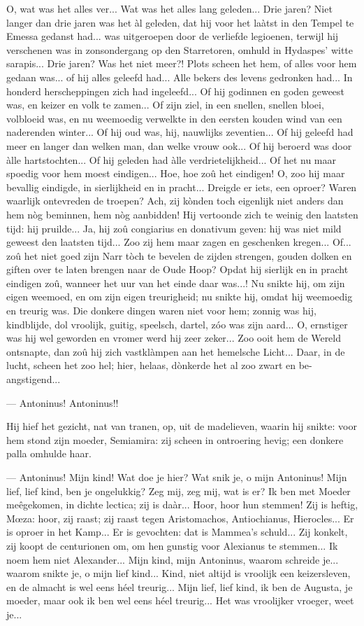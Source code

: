 \documentclass[a4paper, 12pt, oneside, dutch]{article}
\begin{document}
O, wat was het alles ver... Wat was het alles lang geleden... Drie jaren? Niet langer dan drie jaren was het àl geleden, dat hij voor het laàtst in den Tempel te Emessa gedanst had... was uitgeroepen door de verliefde legioenen, terwijl hij verschenen was in zonsondergang op den Starretoren, omhuld in Hydaspes' witte sarapis... Drie jaren? Was het niet meer?! Plots scheen het hem, of alles voor hem gedaan was... of hij alles geleefd had... Alle bekers des levens gedronken had... In honderd herscheppingen zich had ingeleefd... Of hij godinnen en goden geweest was, en keizer en volk te zamen... Of zijn ziel, in een snellen, snellen bloei, volbloeid was, en nu weemoedig verwelkte in den eersten kouden wind van een naderenden winter... Of hij oud was, hij, nauwlijks zeventien... Of hij geleefd had meer en langer dan welken man, dan welke vrouw ook... Of hij beroerd was door àlle hartstochten... Of hij geleden had àlle verdrietelijkheid... Of het nu maar spoedig voor hem moest eindigen... Hoe, hoe zoû het eindigen! O, zoo hij maar bevallig eindigde, in sierlijkheid en in pracht... Dreigde er iets, een oproer? Waren waarlijk ontevreden de troepen? Ach, zij kònden toch eigenlijk niet anders dan hem nòg beminnen, hem nòg aanbidden! Hij vertoonde zich te weinig den laatsten tijd: hij pruilde... Ja, hij zoû congiarius en donativum geven: hij was niet mild geweest den laatsten tijd... Zoo zij hem maar zagen en geschenken kregen... Of... zoû het niet goed zijn Narr tòch te bevelen de zijden strengen, gouden dolken en giften over te laten brengen naar de Oude Hoop? Opdat hij sierlijk en in pracht eindigen zoû, wanneer het uur van het einde daar was...! Nu snikte hij, om zijn eigen weemoed, en om zijn eigen treurigheid; nu snikte hij, omdat hij weemoedig en treurig was. Die donkere dingen waren niet voor hem; zonnig was hij, kindblijde, dol vroolijk, guitig, speelsch, dartel, zóo was zijn aard... O, ernstiger was hij wel geworden en vromer werd hij zeer zeker... Zoo ooit hem de Wereld ontsnapte, dan zoû hij zich vastklàmpen aan het hemelsche Licht... Daar, in de lucht, scheen het zoo hel; hier, helaas, dònkerde het al zoo zwart en be-angstigend...

--- Antoninus! Antoninus!!

Hij hief het gezicht, nat van tranen, op, uit de madelieven, waarin hij snikte: voor hem stond zijn moeder, Semiamira: zij scheen in ontroering hevig; een donkere palla omhulde haar.

--- Antoninus! Mijn kind! Wat doe je hier? Wat snik je, o mijn Antoninus! Mijn lief, lief kind, ben je ongelukkig? Zeg mij, zeg mij, wat is er? Ik ben met Moeder meêgekomen, in dichte lectica; zij is daàr... Hoor, hoor hun stemmen! Zij is heftig, Mœza: hoor, zij raast; zij raast tegen Aristomachos, Antiochianus, Hierocles... Er is oproer in het Kamp... Er is gevochten: dat is Mammea's schuld... Zij konkelt, zij koopt de centurionen om, om hen gunstig voor Alexianus te stemmen... Ik noem hem niet Alexander... Mijn kind, mijn Antoninus, waarom schreide je... waarom snikte je, o mijn lief kind... Kind, niet altijd is vroolijk een keizersleven, en de almacht is wel eens héel treurig... Mijn lief, lief kind, ik ben de Augusta, je moeder, maar ook ik ben wel eens héel treurig... Het was vroolijker vroeger, weet je...
\end{document}
